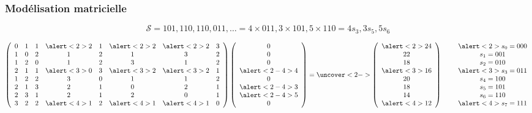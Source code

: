 \documentclass[table]{beamer}
\newcommand{\+}{\cellcolor[gray]{1}\bfseries}
\newcommand{\<}{\cellcolor[gray]{0.8}\rmfamily\itshape}
\def\S{\mathcal{S}}
\begin{document}
\begin{frame}
  \frametitle{Modélisation matricielle}

  \begin{displaymath}
    \S = 101, 110, 110, 011, \ldots = 4 \times 011, 3 \times
    101, 5 \times 110 = 4s_3, 3s_5, 5s_6
  \end{displaymath}

  \begin{displaymath}
    \left(
      \begin{array}{cccccccc}
        0 & 1 & 1 &\alert<2>{2}& 1 &\alert<2>{2}&\alert<2>{2}& 3\\
        1 & 0 & 2 & 1 & 2 & 1 & 3 & 2\\
        1 & 2 & 0 & 1 & 2 & 3 & 1 & 2\\
        2 & 1 & 1 &\alert<3>{0}& 3 &\alert<3>{2}&\alert<3>{2}& 1\\
        1 & 2 & 2 & 3 & 0 & 1 & 1 & 2\\
        2 & 1 & 3 & 2 & 1 & 0 & 2 & 1\\
        2 & 3 & 1 & 2 & 1 & 2 & 0 & 1\\
        3 & 2 & 2 &\alert<4>{1}& 2 &\alert<4>{1}&\alert<4>{1}& 0\\
      \end{array}
    \right)\left(
      \begin{array}{c}
        0\\
        0\\
        0\\
        \alert<2-4>{4}\\
        0\\
        \alert<2-4>{3}\\
        \alert<2-4>{5}\\
        0\\
      \end{array}
    \right) =
    \uncover<2->{
      \left(
        \begin{array}{c}
          \alert<2>{24}\\
          22\\
          18\\
          \alert<3>{16}\\
          20\\
          18\\
          14\\
          \alert<4>{12}\\
        \end{array}
      \right)
    }
    \qquad
    \begin{array}{c}
      \alert<2>{s_0 = 000}\\
      s_1 = 001\\
      s_2 = 010\\
      \alert<3>{s_3 = 011}\\
      s_4 = 100\\
      s_5 = 101\\
      s_6 = 110\\
      \alert<4>{s_7 = 111}\\
    \end{array}
  \end{displaymath}\pause[5]


\end{frame}
\end{document}
